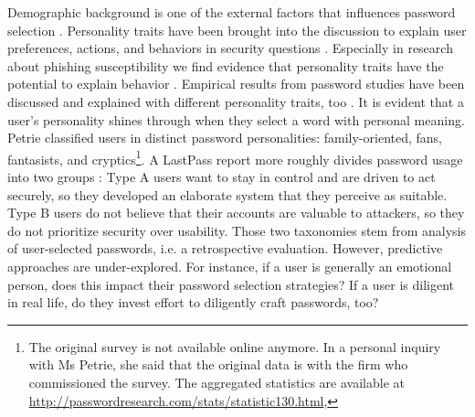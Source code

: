 Demographic background is one of the external factors that influences password selection \cite{Mazurek2013Measuring,  Violettas2014PasswordsAvoidGreece, Wang2015ChinesePWs}. Personality traits have been brought into the discussion to explain user preferences, actions, and behaviors in security questions \cite{Brown2004GeneratingPWs, Gross2016EffectCognitiveEffort, Shropshire2006PersonalityITSec, Zakaria2013DesigningEffectiveSecurityMessages}. Especially in research about phishing susceptibility we find evidence that personality traits have the potential to explain behavior \cite{Halevi2013PilotStudyPersonality,Halevi2015SpearPhishing,ParrishJr2009PersonalityPhishing,Uebelacker2014SocialEngineering}. 
Empirical results from password studies have been discussed and explained with different personality traits, too \cite{Haque2014PsychometricsStrongPassword,Weirich2001PrettyGoodPersuasion}. It is evident that a user's personality shines through when they select a word with personal meaning. 
Petrie classified users in distinct password personalities: family-oriented, fans, fantasists, and cryptics\footnote{The original survey is not available online anymore. In a personal inquiry with Ms Petrie, she said that the original data is with the firm who commissioned the survey. The aggregated statistics are available at \url{http://passwordresearch.com/stats/statistic130.html}, }. A LastPass report more roughly divides password usage into two groups \cite{LastPass2016PersonalitiesGetUsHacked}: Type A users want to stay in control and are driven to act securely, so they developed an elaborate system that they perceive as suitable. Type B users do not believe that their accounts are valuable to attackers, so they do not prioritize security over usability. 
Those two taxonomies stem from analysis of user-selected passwords, i.e. a retrospective evaluation. However, predictive approaches are under-explored. For instance, if a user is generally an emotional person, does this impact their password selection strategies? If a user is diligent in real life, do they invest effort to diligently craft passwords, too? 

